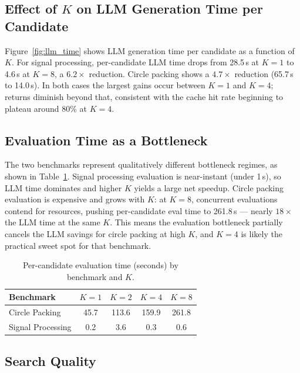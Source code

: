 \documentclass{article}
\begin{document}
\subsection{Effect of $K$ on LLM Generation Time per Candidate}

Figure~\ref{fig:llm_time} shows LLM generation time per candidate as a
function of $K$. For signal processing, per-candidate LLM time drops
from 28.5\,s at $K{=}1$ to 4.6\,s at $K{=}8$, a $6.2\times$ reduction.
Circle packing shows a $4.7\times$ reduction (65.7\,s to 14.0\,s). In
both cases the largest gains occur between $K{=}1$ and $K{=}4$; returns
diminish beyond that, consistent with the cache hit rate beginning to
plateau around 80\% at $K{=}4$.

\subsection{Evaluation Time as a Bottleneck}

The two benchmarks represent qualitatively different bottleneck regimes,
as shown in Table~\ref{tab:eval_time}. Signal processing evaluation is
near-instant (under 1\,s), so LLM time dominates and higher $K$ yields a
large net speedup. Circle packing evaluation is expensive and grows with
$K$: at $K{=}8$, concurrent evaluations contend for resources, pushing
per-candidate eval time to 261.8\,s --- nearly $18\times$ the LLM time at
the same $K$. This means the evaluation bottleneck partially cancels the
LLM savings for circle packing at high $K$, and $K{=}4$ is likely the
practical sweet spot for that benchmark.

\begin{table}[ht]
\centering
\small
\caption{Per-candidate evaluation time (seconds) by benchmark and $K$.}
\label{tab:eval_time}
\begin{tabular}{lcccc}
\toprule
Benchmark & $K{=}1$ & $K{=}2$ & $K{=}4$ & $K{=}8$ \\
\midrule
Circle Packing    & 45.7 & 113.6 & 159.9 & 261.8 \\
Signal Processing &  0.2 &   3.6 &   0.3 &   0.6 \\
\bottomrule
\end{tabular}
\end{table}

\subsection{Search Quality}
\end{document}
